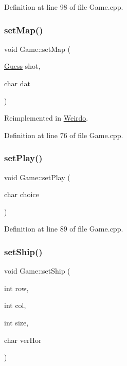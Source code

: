 Definition at line 98 of file Game.\+cpp.

\mbox{\label{class_game_a4e23ede628f25d35813322e4e3f46b01}} 
\subsubsection{\texorpdfstring{set\+Map()}{setMap()}}
{\footnotesize\ttfamily void Game\+::set\+Map (\begin{DoxyParamCaption}\item[{\hyperlink{class_guess}{Guess}}]{shot,  }\item[{char}]{dat }\end{DoxyParamCaption})\hspace{0.3cm}{\ttfamily [virtual]}}



Reimplemented in \hyperlink{class_weirdo_aa71d633becb93a3d1b6273f5b0a8dc14}{Weirdo}.



Definition at line 76 of file Game.\+cpp.

\mbox{\label{class_game_a9acc18b29b10e44174bb4c0c59886469}} 
\subsubsection{\texorpdfstring{set\+Play()}{setPlay()}}
{\footnotesize\ttfamily void Game\+::set\+Play (\begin{DoxyParamCaption}\item[{char}]{choice }\end{DoxyParamCaption})}



Definition at line 89 of file Game.\+cpp.

\mbox{\label{class_game_aa4612d0ad265babef74c3a1122d0a395}} 
\subsubsection{\texorpdfstring{set\+Ship()}{setShip()}}
{\footnotesize\ttfamily void Game\+::set\+Ship (\begin{DoxyParamCaption}\item[{int}]{row,  }\item[{int}]{col,  }\item[{int}]{size,  }\item[{char}]{ver\+Hor }\end{DoxyParamCaption})}



